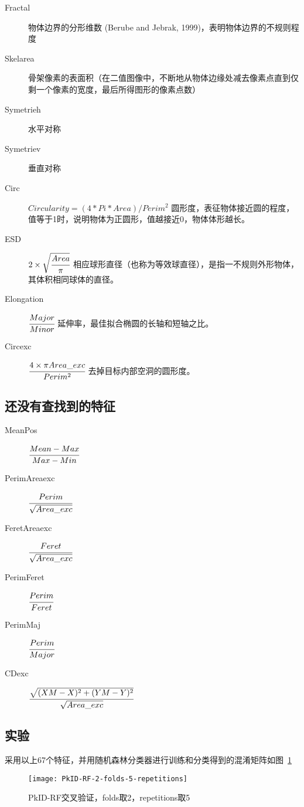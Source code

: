 \begin{description}
    \item[Fractal] 物体边界的分形维数 (Berube and Jebrak, 1999)，表明物体边界的不规则程度
    \item[Skelarea] 骨架像素的表面积（在二值图像中，不断地从物体边缘处减去像素点直到仅剩一个像素的宽度，最后所得图形的像素点数）
    \item[Symetrieh] 水平对称
    \item[Symetriev] 垂直对称
    \item[Circ] $Circularity = (4 * Pi * Area) / Perim^2$ 圆形度，表征物体接近圆的程度，值等于1时，说明物体为正圆形，值越接近0，物体体形越长。
    \item[ESD] $2 \times \sqrt{\cfrac{Area}{\pi}}$ 相应球形直径（也称为等效球直径），是指一不规则外形物体，其体积相同球体的直径。
    \item[Elongation] $\cfrac{Major}{Minor}$ 延伸率，最佳拟合椭圆的长轴和短轴之比。
    \item[Circexc] $\cfrac{4 \times \pi Area\_exc}{Perim^{2}}$ 去掉目标内部空洞的圆形度。
\end{description}

\subsection{还没有查找到的特征}

\begin{description}
    \item[MeanPos] $\cfrac{Mean-Max}{Max-Min}$
    \item[PerimAreaexc] $\cfrac{Perim}{\sqrt{Area\_exc}}$ 
    \item[FeretAreaexc] $\cfrac{Feret}{\sqrt{Area\_exc}}$
    \item[PerimFeret] $\cfrac{Perim}{Feret}$
    \item[PerimMaj] $\cfrac{Perim}{Major}$
    \item[CDexc] $\cfrac{\sqrt{(XM-X)^{2}+(YM-Y)^{2}}}{{\sqrt{Area\_exc}}}$ 
\end{description}

\subsection{实验}

采用以上67个特征，并用随机森林分类器进行训练和分类得到的混淆矩阵如图~\ref{fig: PkID-RF-2-folds-5-repetitions}

\begin{figure}[!ht]
\centering
\texttt{[image: PkID-RF-2-folds-5-repetitions]}
\caption{PkID-RF交叉验证，folds取2，repetitions取5}
\label{fig: PkID-RF-2-folds-5-repetitions}
\end{figure}




